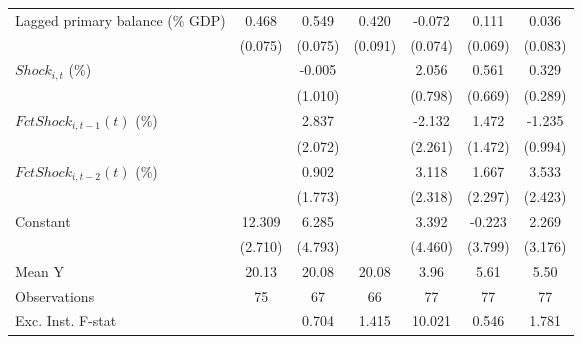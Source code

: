 {\begin{tabular}{l*{6}{c}}
\addlinespace
Lagged primary balance (\% GDP)&       0.468\sym{***}&       0.549\sym{***}&       0.420\sym{***}&      -0.072         &       0.111         &       0.036         \\
                    &     (0.075)         &     (0.075)         &     (0.091)         &     (0.074)         &     (0.069)         &     (0.083)         \\
\addlinespace
$ Shock_{i,t}$ (\%) &                     &      -0.005         &                     &       2.056\sym{**} &       0.561         &       0.329         \\
                    &                     &     (1.010)         &                     &     (0.798)         &     (0.669)         &     (0.289)         \\
\addlinespace
$ FctShock_{i,t-1}(t)$ (\%)&                     &       2.837         &                     &      -2.132         &       1.472         &      -1.235         \\
                    &                     &     (2.072)         &                     &     (2.261)         &     (1.472)         &     (0.994)         \\
\addlinespace
$ FctShock_{i,t-2}(t)$ (\%)&                     &       0.902         &                     &       3.118         &       1.667         &       3.533         \\
                    &                     &     (1.773)         &                     &     (2.318)         &     (2.297)         &     (2.423)         \\
\addlinespace
Constant            &      12.309\sym{***}&       6.285         &                     &       3.392         &      -0.223         &       2.269         \\
                    &     (2.710)         &     (4.793)         &                     &     (4.460)         &     (3.799)         &     (3.176)         \\
\midrule
Mean Y              &       20.13         &       20.08         &       20.08         &        3.96         &        5.61         &        5.50         \\
Observations        &          75         &          67         &          66         &          77         &          77         &          77         \\
Exc. Inst. F-stat   &                     &       0.704         &       1.415         &      10.021         &       0.546         &       1.781         \\
\bottomrule
\end{tabular}
}

